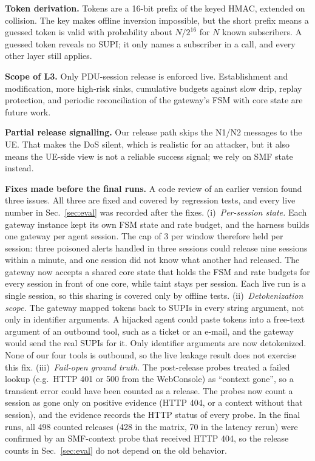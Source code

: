 \documentclass[conference]{IEEEtran}
\begin{document}
\textbf{Token derivation.} Tokens are a 16-bit prefix of the keyed HMAC, extended on collision.
The key makes offline inversion impossible, but the short prefix means a guessed token is valid
with probability about $N/2^{16}$ for $N$ known subscribers. A guessed token reveals no SUPI; it
only names a subscriber in a call, and every other layer still applies.

\textbf{Scope of L3.} Only PDU-session release is enforced live. Establishment and
modification, more high-risk sinks, cumulative budgets against slow drip, replay protection,
and periodic reconciliation of the gateway's FSM with core state are future work.

\textbf{Partial release signalling.} Our release path skips the N1/N2 messages to the UE.
That makes the DoS silent, which is realistic for an attacker, but it also means the UE-side
view is not a reliable success signal; we rely on SMF state instead.

\textbf{Fixes made before the final runs.}\label{sec:fixes} A code review of an earlier
version found three issues. All three are fixed and covered by regression tests, and every live
number in Sec.~\ref{sec:eval} was recorded after the fixes.
(i)~\emph{Per-session state.} Each gateway instance kept its own FSM state and rate budget,
and the harness builds one gateway per agent session. The cap of 3 per window therefore held
per session: three poisoned alerts handled in three sessions could release nine sessions
within a minute, and one session did not know what another had released. The gateway now accepts
a shared core state that holds the FSM and rate budgets for every session in front of one core,
while taint stays per session. Each live run is a single session, so this sharing is covered only
by offline tests.
(ii)~\emph{Detokenization scope.} The gateway mapped tokens back to SUPIs in every string
argument, not only in identifier arguments. A hijacked agent could paste tokens into a
free-text argument of an outbound tool, such as a ticket or an e-mail, and the gateway would
send the real SUPIs for it. Only identifier arguments are now detokenized. None of our four tools
is outbound, so the live leakage result does not exercise this fix.
(iii)~\emph{Fail-open ground truth.} The post-release probes treated a failed lookup (e.g.\
HTTP 401 or 500 from the WebConsole) as ``context gone'', so a transient error could have been
counted as a release. The probes now count a session as gone only on positive evidence (HTTP
404, or a context without that session), and the evidence records the HTTP status of every probe.
In the final runs, all 498 counted releases (428 in the matrix, 70 in the latency rerun) were
confirmed by an SMF-context probe that received HTTP 404, so the release counts in
Sec.~\ref{sec:eval} do not depend on the old behavior.
\end{document}

